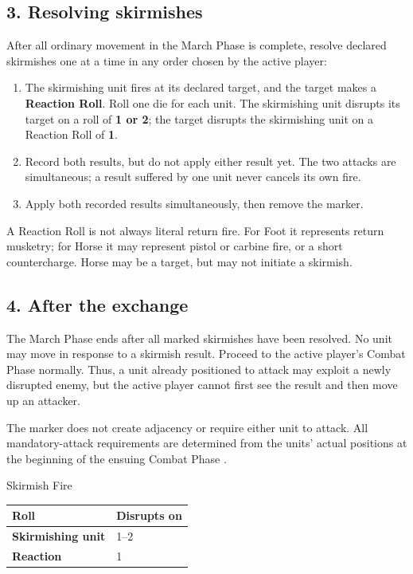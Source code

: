 \begin{multicols}{2}
\subsection{3. Resolving skirmishes}

After all ordinary movement in the March Phase is complete, resolve declared
skirmishes one at a time in any order chosen by the active player:

\begin{enumerate}
  \item The skirmishing unit fires at its declared target, and the target makes
        a \textbf{Reaction Roll}. Roll one die for each unit. The skirmishing
        unit disrupts its target on a roll of \textbf{1 or 2}; the target
        disrupts the skirmishing unit on a Reaction Roll of \textbf{1}.
  \item Record both results, but do not apply either result yet. The two attacks
        are simultaneous; a result suffered by one unit never cancels its own
        fire.
  \item Apply both recorded results simultaneously, then remove the marker.
\end{enumerate}

A Reaction Roll is not always literal return fire. For Foot it represents return
musketry; for Horse it may represent pistol or carbine fire, or a short
countercharge. Horse may be a target, but may not initiate a skirmish.

\subsection{4. After the exchange}

The March Phase ends after all marked skirmishes have been resolved. No unit may
move in response to a skirmish result. Proceed to the active player's Combat
Phase normally. Thus, a unit already positioned to attack may exploit a newly
disrupted enemy, but the active player cannot first see the result and then move
up an attacker.

The marker does not create adjacency or require either unit to attack. All
mandatory-attack requirements are determined from the units' actual positions
at the beginning of the ensuing Combat Phase .

\begin{rulebox}{Skirmish Fire}
\centering
\begin{tabularx}{\linewidth}{@{}>{\bfseries}l Y@{}}
  \toprule
  Roll & Disrupts on \\
  \midrule
  Skirmishing unit & 1--2 \\
  Reaction & 1 \\
  \bottomrule
\end{tabularx}
\end{rulebox}


\end{multicols}
